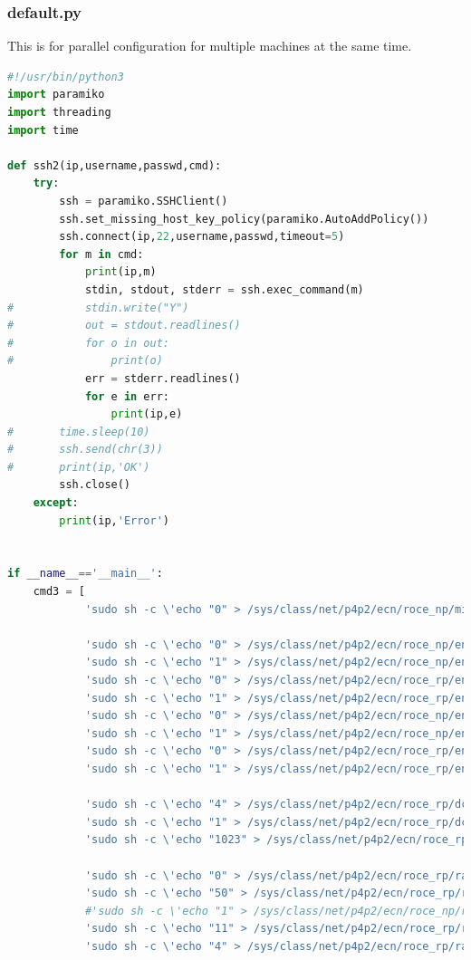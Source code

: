 \documentclass[12pt,a4paper]{article}
\begin{document}
\subsubsection*{default.py}
This is for parallel configuration for multiple machines at the same time.
\begin{lstlisting}[language=Python]
#!/usr/bin/python3
import paramiko
import threading
import time

def ssh2(ip,username,passwd,cmd):
    try:
        ssh = paramiko.SSHClient()
        ssh.set_missing_host_key_policy(paramiko.AutoAddPolicy())
        ssh.connect(ip,22,username,passwd,timeout=5)
        for m in cmd:
            print(ip,m)
            stdin, stdout, stderr = ssh.exec_command(m)
#			stdin.write("Y")
#			out = stdout.readlines()
#			for o in out:
#				print(o)
            err = stderr.readlines()
            for e in err:
                print(ip,e)
#		time.sleep(10)
#		ssh.send(chr(3))
#		print(ip,'OK')
        ssh.close()
    except:
        print(ip,'Error')


if __name__=='__main__':
    cmd3 = [
            'sudo sh -c \'echo "0" > /sys/class/net/p4p2/ecn/roce_np/min_time_between_cnps\'',

            'sudo sh -c \'echo "0" > /sys/class/net/p4p2/ecn/roce_np/enable/3\'',
            'sudo sh -c \'echo "1" > /sys/class/net/p4p2/ecn/roce_np/enable/3\'',
            'sudo sh -c \'echo "0" > /sys/class/net/p4p2/ecn/roce_rp/enable/3\'',
            'sudo sh -c \'echo "1" > /sys/class/net/p4p2/ecn/roce_rp/enable/3\'',
            'sudo sh -c \'echo "0" > /sys/class/net/p4p2/ecn/roce_np/enable/4\'',
            'sudo sh -c \'echo "1" > /sys/class/net/p4p2/ecn/roce_np/enable/4\'',
            'sudo sh -c \'echo "0" > /sys/class/net/p4p2/ecn/roce_rp/enable/4\'',
            'sudo sh -c \'echo "1" > /sys/class/net/p4p2/ecn/roce_rp/enable/4\'',

            'sudo sh -c \'echo "4" > /sys/class/net/p4p2/ecn/roce_rp/dce_tcp_g\'',
            'sudo sh -c \'echo "1" > /sys/class/net/p4p2/ecn/roce_rp/dce_tcp_rtt\'',
            'sudo sh -c \'echo "1023" > /sys/class/net/p4p2/ecn/roce_rp/initial_alpha_value\'',

            'sudo sh -c \'echo "0" > /sys/class/net/p4p2/ecn/roce_rp/rate_to_set_on_first_cnp\'',
            'sudo sh -c \'echo "50" > /sys/class/net/p4p2/ecn/roce_rp/rpg_min_dec_fac\'',
            #'sudo sh -c \'echo "1" > /sys/class/net/p4p2/ecn/roce_np/rpg_min_rate\'',
            'sudo sh -c \'echo "11" > /sys/class/net/p4p2/ecn/roce_rp/rpg_gd\'',
            'sudo sh -c \'echo "4" > /sys/class/net/p4p2/ecn/roce_rp/rate_reduce_monitor_period\'',


\end{lstlisting}
\end{document}
